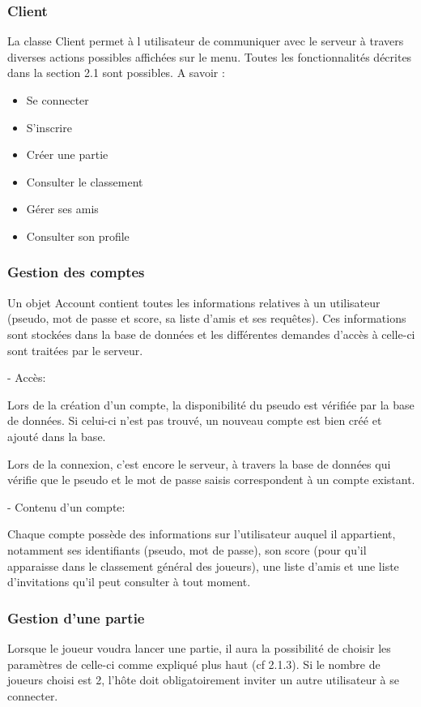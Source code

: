 \documentclass[a4paper,12pt]{article}
\begin{document}
\subsubsection{Client}
La classe Client permet à l utilisateur de communiquer avec le serveur à travers diverses actions possibles affichées sur le menu.
Toutes les fonctionnalités décrites dans la section 2.1 sont possibles. A savoir : 
\begin{itemize}
    \item Se connecter
    \item S'inscrire
    \item Créer une partie
    \item Consulter le classement
    \item Gérer ses amis
    \item Consulter son profile
\end{itemize}


\subsubsection{Gestion des comptes}
Un objet Account contient toutes les informations relatives à un utilisateur (pseudo, mot de passe et score, sa liste d'amis et ses requêtes). 
Ces informations sont stockées dans la base de données et les différentes demandes d'accès à celle-ci sont traitées par le serveur.

- Accès:

Lors de la création d'un compte, la disponibilité du pseudo est vérifiée par la base de données. Si celui-ci n'est pas trouvé, un nouveau compte est bien créé et ajouté dans la base.

Lors de la connexion, c'est encore le serveur, à travers la base de données qui vérifie que le pseudo et le mot de passe saisis correspondent à un compte existant.

- Contenu d'un compte:

Chaque compte possède des informations sur l'utilisateur auquel il appartient, notamment ses identifiants (pseudo, mot de passe), son score (pour qu'il apparaisse dans le classement général des joueurs), une liste d'amis et une liste d'invitations qu'il peut consulter à tout moment.

\subsubsection{Gestion d'une partie}

Lorsque le joueur voudra lancer une partie,
il aura la possibilité de choisir les paramètres de celle-ci comme expliqué plus haut (cf 2.1.3). Si le nombre de joueurs choisi est 2, l'hôte doit obligatoirement inviter un autre utilisateur à se connecter.
\end{document}
